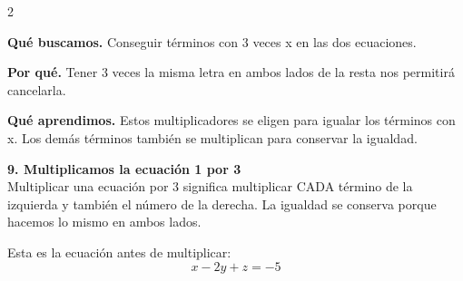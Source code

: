 \documentclass[11pt,a4paper,landscape]{article}
\begin{document}
\begin{multicols*}{2}
\begin{minipage}{\linewidth}
\par\smallskip\textbf{Qué buscamos.} Conseguir términos con 3 veces x en las dos ecuaciones.
\par\smallskip\textbf{Por qué.} Tener 3 veces la misma letra en ambos lados de la resta nos permitirá cancelarla.
\par{}\par\smallskip
\par\smallskip\textbf{Qué aprendimos.} Estos multiplicadores se eligen para igualar los términos con x. Los demás términos también se multiplican para conservar la igualdad.
\end{minipage}\par\medskip
\noindent\begin{minipage}{\linewidth}\textbf{9. Multiplicamos la ecuación 1 por 3}\\[2pt]Multiplicar una ecuación por 3 significa multiplicar CADA término de la izquierda y también el número de la derecha. La igualdad se conserva porque hacemos lo mismo en ambos lados.
\par\smallskip Esta es la ecuación antes de multiplicar:
\[x - 2y + z = -5\]
\par{}\par\smallskip

\end{minipage}
\end{multicols*}
\end{document}

